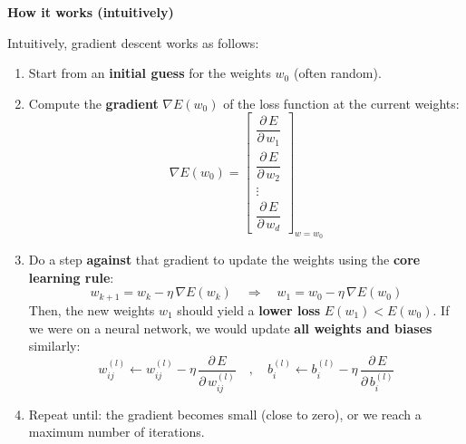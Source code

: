\begin{flushleft}
    \textcolor{Green3}{ \textbf{How it works (intuitively)}}
\end{flushleft}
Intuitively, gradient descent works as follows:
\begin{enumerate}
    \item Start from an \textbf{initial guess} for the weights $w_{0}$ (often random).
    \item Compute the \textbf{gradient} $\nabla E(w_{0})$ of the loss function at the current weights:
    \begin{equation*}
        \nabla E(w_{0}) = \begin{bmatrix}
            \dfrac{\partial \, E}{\partial \, w_{1}} \\[1.2em]
            \dfrac{\partial \, E}{\partial \, w_{2}} \\[1.2em]
            \vdots \\
            \dfrac{\partial \, E}{\partial \, w_{d}}
        \end{bmatrix}_{w = w_{0}}
    \end{equation*}

    \item Do a step \textbf{against} that gradient to update the weights using the \textbf{core learning rule}:
    \begin{equation*}
        w_{k+1} = w_{k} - \eta \,\nabla E(w_{k})
        \quad \Rightarrow \quad
        w_{1} = w_{0} - \eta \,\nabla E(w_{0})
    \end{equation*}
    Then, the new weights $w_{1}$ should yield a \textbf{lower loss} $E(w_{1}) < E(w_{0})$. If we were on a neural network, we would update \textbf{all weights and biases} similarly:
    \begin{equation*}
        w_{ij}^{(l)} \leftarrow w_{ij}^{(l)} - \eta \,\dfrac{\partial \, E}{\partial \, w_{ij}^{(l)}}
        \quad , \quad
        b_{i}^{(l)} \leftarrow b_{i}^{(l)} - \eta \,\dfrac{\partial \, E}{\partial \, b_{i}^{(l)}}
    \end{equation*}
    \item Repeat until: the gradient becomes small (close to zero), or we reach a maximum number of iterations.
\end{enumerate}

